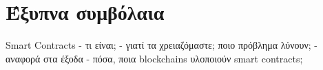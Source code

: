 \section{Έξυπνα συμβόλαια}

Smart Contracts
    - τι είναι;
    - γιατί τα χρειαζόμαστε; ποιο πρόβλημα λύνουν;
    - αναφορά στα έξοδα
    - πόσα, ποια blockchains υλοποιούν smart contracts;
